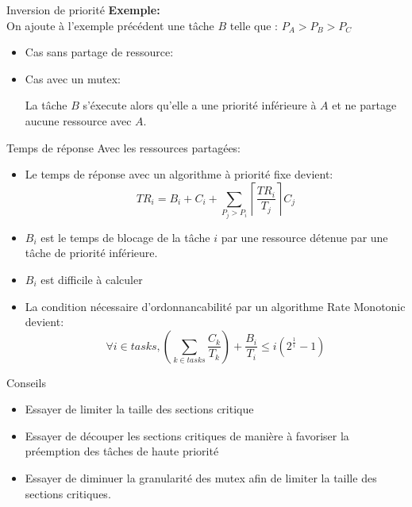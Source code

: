 \begin{frame}{Inversion de priorité}
  \textbf{Exemple:}\\
  On ajoute à l'exemple précédent une  tâche $B$ telle que : 
  $P_A > P_B > P_C$
  \begin{itemize} 
  \item   Cas sans partage de ressource:
    \begin{center}
      
    \end{center}
  \item   Cas avec un mutex:
    \begin{center}
      
    \end{center}
    La tâche $B$  s'éxecute alors qu'elle a une  priorité inférieure à
    $A$ et ne partage aucune ressource avec $A$.
  \end{itemize} 
\end{frame} 

\begin{frame}{Temps de réponse}
  Avec  les  ressources  partagées:
  \begin{itemize} 
  \item  Le  temps de  réponse  avec  un  algorithme à  priorité  fixe
    devient:
    $$TR_i = B_i + C_i + \sum_{P_j > P_i} \left\lceil\frac{TR_i}{T_j}\right\rceil C_j$$
  \item  $B_i$  est le  temps  de  blocage de  la  tâche  $i$ par  une
    ressource
    détenue par une tâche de priorité inférieure.
  \item $B_i$ est difficile à calculer
  \item La  condition nécessaire d'ordonnancabilité  par un algorithme
    Rate Monotonic devient:
    $$\forall i \in tasks, \left( \sum_{k \in tasks} \frac{C_k}{T_k} \right) + \frac{B_i}{T_i} ≤ i \left(2^{\frac{1}{i}}-1\right)$$
  \end{itemize} 
\end{frame}

\begin{frame}{Conseils}
  \begin{itemize} 
  \item Essayer de limiter la taille des sections critique
  \item  Essayer  de découper  les  sections  critiques  de manière  à
    favoriser la préemption des tâches de haute priorité
  \item Essayer de  diminuer la granularité des mutex  afin de limiter
    la taille des sections critiques.
  \end{itemize} 
\end{frame} 

